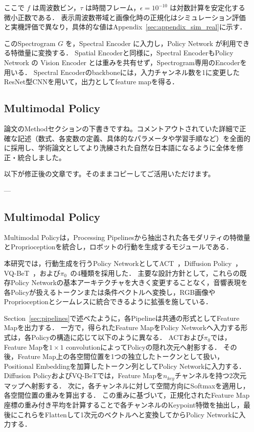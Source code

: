 \documentclass{article}
\begin{document}
	ここで $f$ は周波数ビン，$\tau$ は時間フレーム，$\epsilon=10^{-10}$ は対数計算を安定化する微小正数である．
	表示周波数帯域と画像化時の正規化はシミュレーション評価と実機評価で異なり，具体的な値はAppendix~\ref{sec:appendix_sim_real}に示す．

	このSpectrogram $G$ を，Spectral Encoder に入力し，Policy Network が利用できる特徴量に変換する．
	Spatial Encoderと同様に，Spectral EncoderもPolicy Network の Vision Encoder とは重みを共有せず，Spectrogram専用のEncoderを用いる．
	Spectral Encoderのbackboneには，入力チャンネル数を1に変更したResNet型CNNを用いて，出力としてfeature mapを得る．





\subsection{Multimodal Policy}
\label{sec:policy}
論文のMethodセクションの下書きですね。コメントアウトされていた詳細で正確な記述（数式、各変数の定義、具体的なパラメータや学習手順など）を全面的に採用し、学術論文としてより洗練された自然な日本語になるように全体を修正・統合しました。

以下が修正後の文章です。そのままコピーしてご活用いただけます。

---

\subsection{Multimodal Policy}
\label{sec:policy}
	Multimodal Policyは，Processing Pipelinesから抽出された各モダリティの特徴量とProprioceptionを統合し，ロボットの行動を生成するモジュールである．

	本研究では，行動生成を行うPolicy NetworkとしてACT~\citep{act}，Diffusion Policy~\citep{diffusionpolicy}，VQ-BeT~\citep{vqbet}，および$\pi_0$~\citep{pi0}の4種類を採用した．
	主要な設計方針として，これらの既存Policy Networkの基本アーキテクチャを大きく変更することなく，音響表現を各Policyが扱えるトークンまたは条件ベクトルへ変換し，RGB画像やProprioceptionとシームレスに統合できるように拡張を施している．

	Section~\ref{sec:pipelines}で述べたように，各Pipelineは共通の形式としてFeature Mapを出力する．
	一方で，得られたFeature MapをPolicy Networkへ入力する形式は，各Policyの構造に応じて以下のように異なる．
	ACTおよび$\pi_0$では，Feature Mapを$1\times1$ convolutionによってPolicyの隠れ次元へ射影する．
	その後，Feature Map上の各空間位置を1つの独立したトークンとして扱い，Positional Embeddingを加算したトークン列としてPolicy Networkに入力する．
	Diffusion PolicyおよびVQ-BeTでは，Feature Mapを$n_{key}$チャンネルを持つ2次元マップへ射影する．
	次に，各チャンネルに対して空間方向にSoftmaxを適用し，各空間位置の重みを算出する．
	この重みに基づいて，正規化されたFeature Map座標の重み付き平均を計算することで各チャンネルのKeypoint特徴を抽出し，最後にこれらをFlattenして1次元のベクトルへと変換してからPolicy Networkに入力する．
\end{document}
